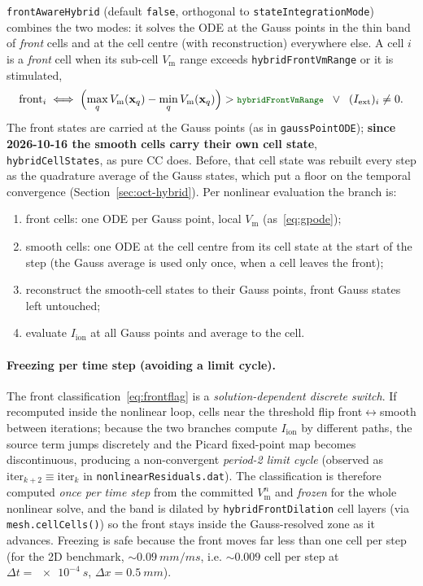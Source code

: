 \documentclass[11pt,a4paper]{article}
\newcommand{\code}[1]{\texttt{\small #1}}
\newcommand{\Vm}{V_{\text{m}}}
\newcommand{\Iion}{I_{\mathrm{ion}}}
\newcommand{\Iext}{I_{\mathrm{ext}}}
\newcommand{\dictkey}[1]{\textcolor{black!60!green}{\texttt{\footnotesize #1}}}
\begin{document}
\dictkey{frontAwareHybrid} (default \code{false}, orthogonal to
\dictkey{stateIntegrationMode}) combines the two modes: it solves the
ODE at the Gauss points in the thin band of \emph{front} cells and at the cell
centre (with reconstruction) everywhere else. A cell $i$ is a \emph{front} cell
when its sub-cell $\Vm$ range exceeds \dictkey{hybridFrontVmRange} or it is
stimulated,
\begin{equation}
  \text{front}_i \;\Longleftrightarrow\;
  \Bigl(\max_q\Vm(\mathbf{x}_q)-\min_q\Vm(\mathbf{x}_q)\Bigr)
     > \dictkey{hybridFrontVmRange}
  \;\;\vee\;\; (\Iext)_i\neq 0 .
  \label{eq:frontflag}
\end{equation}
The front states are carried at the Gauss points (as in
\code{gaussPointODE}); \textbf{since 2026-10-16 the smooth cells carry their own
cell state}, \code{hybridCellStates}, as pure CC does. Before, that cell state was
rebuilt every step as the quadrature average of the Gauss states, which put a
floor on the temporal convergence (Section~\ref{sec:oct-hybrid}). Per nonlinear
evaluation the branch is:
\begin{enumerate}[topsep=2pt,itemsep=1pt,label=(\alph*)]
  \item front cells: one ODE per Gauss point, local $\Vm$ (as~\eqref{eq:gpode});
  \item smooth cells: one ODE at the cell centre from its cell state at the start
        of the step (the Gauss average is used only once, when a cell leaves the
        front);
  \item reconstruct the smooth-cell states to their Gauss points, front Gauss
        states left untouched;
  \item evaluate $\Iion$ at all Gauss points and average to the cell.
\end{enumerate}

\paragraph{Freezing per time step (avoiding a limit cycle).}
The front classification~\eqref{eq:frontflag} is a \emph{solution-dependent
discrete switch}. If recomputed inside the nonlinear loop, cells near the
threshold flip front$\leftrightarrow$smooth between iterations; because the two
branches compute $\Iion$ by different paths, the source term jumps discretely
and the Picard fixed-point map becomes discontinuous, producing a non-convergent
\emph{period-2 limit cycle} (observed as $\text{iter}_{k+2}\equiv\text{iter}_k$
in \code{nonlinearResiduals.dat}). The classification is therefore computed
\emph{once per time step} from the committed $\Vm^{n}$ and \emph{frozen} for the
whole nonlinear solve, and the band is dilated by \dictkey{hybridFrontDilation}
cell layers (via \code{mesh.cellCells()}) so the front stays inside the
Gauss-resolved zone as it advances. Freezing is safe because the front moves far
less than one cell per step (for the 2D benchmark, $\sim\!\SI{0.09}{mm/ms}$, i.e.
$\sim\!0.009$ cell per step at $\Delta t=\SI{e-4}{s}$, $\Delta x=\SI{0.5}{mm}$).
\end{document}
